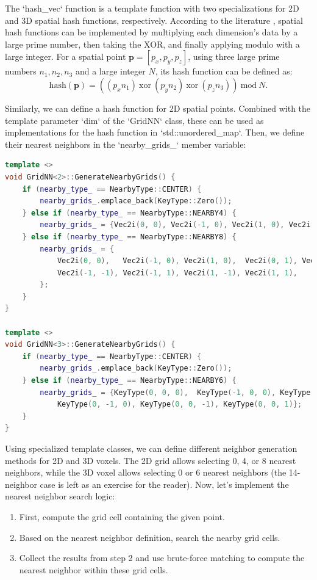 The `hash_vec` function is a template function with two specializations for 2D and 3D spatial hash functions, respectively. According to the literature \cite{Teschner2003}, spatial hash functions can be implemented by multiplying each dimension's data by a large prime number, then taking the XOR, and finally applying modulo with a large integer. For a spatial point \(\mathbf{p}=[p_x, p_y, p_z]\), using three large prime numbers \(n_1, n_2, n_3\) and a large integer \(N\), its hash function can be defined as:
\begin{equation}\label{key}
	\text{hash}(\mathbf{p}) = ((p_x n_1) ~ \mathrm{xor}~ (p_y n_2) ~\mathrm{xor}~ (p_z n_3))~\text{mod}~ N.
\end{equation}

Similarly, we can define a hash function for 2D spatial points. Combined with the template parameter `dim` of the `GridNN` class, these can be used as implementations for the hash function in `std::unordered_map`. Then, we define their nearest neighbors in the `nearby_grids_` member variable:

\begin{lstlisting}[language=c++,caption=src/ch5/gridnn.hpp]
template <>
void GridNN<2>::GenerateNearbyGrids() {
	if (nearby_type_ == NearbyType::CENTER) {
		nearby_grids_.emplace_back(KeyType::Zero());
	} else if (nearby_type_ == NearbyType::NEARBY4) {
		nearby_grids_ = {Vec2i(0, 0), Vec2i(-1, 0), Vec2i(1, 0), Vec2i(0, 1), Vec2i(0, -1)};
	} else if (nearby_type_ == NearbyType::NEARBY8) {
		nearby_grids_ = {
			Vec2i(0, 0),   Vec2i(-1, 0), Vec2i(1, 0),  Vec2i(0, 1), Vec2i(0, -1),
			Vec2i(-1, -1), Vec2i(-1, 1), Vec2i(1, -1), Vec2i(1, 1),
		};
	}
}

template <>
void GridNN<3>::GenerateNearbyGrids() {
	if (nearby_type_ == NearbyType::CENTER) {
		nearby_grids_.emplace_back(KeyType::Zero());
	} else if (nearby_type_ == NearbyType::NEARBY6) {
		nearby_grids_ = {KeyType(0, 0, 0),  KeyType(-1, 0, 0), KeyType(1, 0, 0), KeyType(0, 1, 0),
			KeyType(0, -1, 0), KeyType(0, 0, -1), KeyType(0, 0, 1)};
	}
}
\end{lstlisting}

Using specialized template classes, we can define different neighbor generation methods for 2D and 3D voxels. The 2D grid allows selecting 0, 4, or 8 nearest neighbors, while the 3D voxel allows selecting 0 or 6 nearest neighbors (the 14-neighbor case is left as an exercise for the reader). Now, let's implement the nearest neighbor search logic:
\begin{enumerate}
	\item First, compute the grid cell containing the given point.
	\item Based on the nearest neighbor definition, search the nearby grid cells.
	\item Collect the results from step 2 and use brute-force matching to compute the nearest neighbor within these grid cells.
\end{enumerate}

